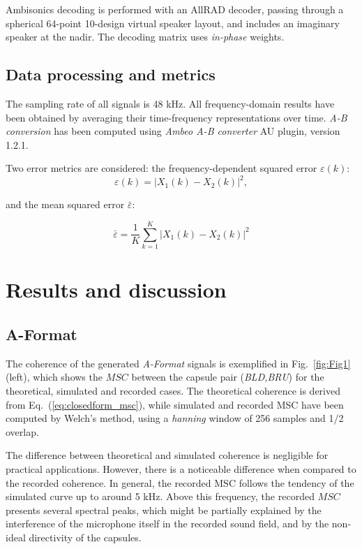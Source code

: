 Ambisonics decoding is performed with an AllRAD decoder, passing through a spherical 64-point 10-design virtual speaker layout, and includes an imaginary speaker at the nadir. The decoding matrix uses \textit{in-phase} weights.



\subsection{Data processing and metrics}

The sampling rate of all signals is 48 kHz.
All frequency-domain results have been obtained by averaging their time-frequency representations over time.  
\textit{A-B conversion} has been computed using \textit{Ambeo A-B converter} AU plugin, version 1.2.1.

Two error metrics are considered: the frequency-dependent squared error $\varepsilon(k)$:
\begin{equation}
	\varepsilon(k) = |X_1(k) - X_2(k)|^2,
	\label{eq:mse}
\end{equation}

 and the mean squared error $\bar{\varepsilon}$:

\begin{equation}
    \bar{\varepsilon} = \frac{1}{K}{\sum_{k=1}^{K} |X_1(k) - X_2(k)|^2}
    \label{eq:nmse}
\end{equation}



\section{Results and discussion}
\subsection{\label{subsec:results_aformat}A-Format}



The coherence of the generated \textit{A-Format} signals is exemplified in Fig.~\ref{fig:Fig1} (left), which shows the $MSC$ between the capsule pair (\textit{BLD,BRU}) for the theoretical, simulated and recorded cases.
The theoretical coherence is derived from Eq.~(\ref{eq:closedform_msc}), while simulated and recorded MSC have been computed by Welch's method, using a \textit{hanning} window of 256 samples and 1/2 overlap.

The difference between theoretical and simulated coherence is negligible for practical applications.
However, there is a noticeable difference when compared to the recorded coherence. 
In general, the recorded $\text{MSC}$ follows the tendency of the simulated curve up to around 5 kHz.
Above this frequency, the recorded $MSC$ presents several spectral peaks, which might be partially explained by the interference of the microphone itself in the recorded sound field, and by the non-ideal directivity of the capsules.


